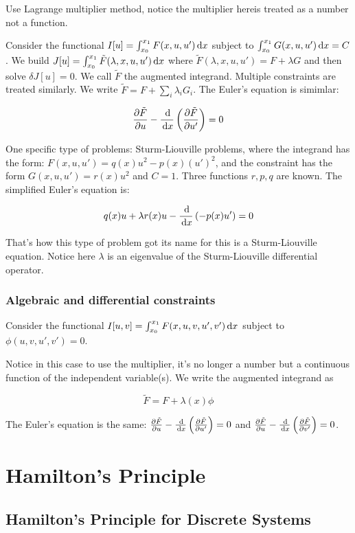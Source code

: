 \documentclass{article}
\begin{document}
Use Lagrange multiplier method, notice the multiplier hereis treated as a number not a function.


Consider the functional \(I[u]=\int_{x_0}^{x_1} F(x,u,u')\,\mathrm{d} x\) subject to \(\int_{x_0}^{x_1} G(x,u,u')\,\mathrm{d} x=C\). We build \(J[u]=\int_{x_0}^{x_1} \tilde F(\lambda, x,u,u')\,\mathrm{d} x\) where \(\tilde F(\lambda, x,u,u')=F+\lambda G\) and then solve \(\delta J[u]=0\). We call \(\tilde F\) the augmented integrand. Multiple constraints are treated similarly. We write \(\tilde F=F+\sum_i \lambda_i G_i\). The Euler's equation is simimlar: 

\[\frac{\partial \tilde F}{\partial u}-\frac{\,\mathrm{d} }{\,\mathrm{d} x}\left( \frac{\partial \tilde F}{\partial u'} \right)=0\]

One specific type of problems: Sturm-Liouville problems, where the integrand has the form: \(F(x,u,u')=q(x)u^2-p(x)(u')^2\), and the constraint has the form \(G(x,u,u')=r(x)u^2\) and \(C=1\). Three functions \(r,p,q\) are known. The simplified Euler's equation is:

\[q(x) u +\lambda r(x)u-\frac{\,\mathrm{d} }{\,\mathrm{d} x}\left( -p(x)u' \right)=0\]

That's how this type of problem got its name for this is a Sturm-Liouville equation. Notice here \(\lambda\) is an eigenvalue of the Sturm-Liouville differential operator.

\subsubsection*{Algebraic and differential constraints}

Consider the functional \(I[u,v]=\int_{x_0}^{x_1} F(x,u,v,u',v')\,\mathrm{d} x\) subject to \(\phi(u,v,u',v')=0\).

Notice in this case to use the multiplier, it's no longer a number but a continuous function of the independent variable(s). We write the augmented integrand as

\[\tilde F = F+\lambda(x)\phi\]

The Euler's equation is the same: \(\frac{\partial \tilde F}{\partial u}-\frac{\,\mathrm{d} }{\,\mathrm{d} x}\left( \frac{\partial \tilde F}{\partial u'} \right)=0\) and \(\frac{\partial \tilde F}{\partial u}-\frac{\,\mathrm{d} }{\,\mathrm{d} x}\left( \frac{\partial \tilde F}{\partial v'} \right)=0\).

\section{Hamilton's Principle}

\subsection{Hamilton's Principle for Discrete Systems}
\end{document}
